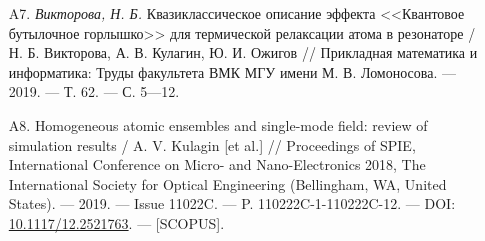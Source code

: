 {\begin{itemize}[leftmargin=24pt]
	\item[A7.]{\textit{Викторова, Н. Б.} Квазиклассическое описание эффекта <<Квантовое бутылочное горлышко>> для термической релаксации атома в резона­торе / Н. Б. Викторова, А. В. Кулагин, Ю. И. Ожигов // Прикладная математика и информатика: Труды факультета ВМК МГУ имени М. В. Ломоносова. — 2019. — Т. 62. — С. 5—12.}
	\item[A8.]{Homogeneous atomic ensembles and single-mode field: review of simulation results / A. V. Kulagin [et al.] // Proceedings of SPIE, International Conference on Micro- and Nano-Electronics 2018, The International Society for Optical Engineering (Bellingham, WA, United States). — 2019. — Issue 11022C. — P. 110222C-1-110222C-12. — DOI: \href{http://dx.doi.org/10.1117/12.2521763}{10.1117/12.2521763}. — [SCOPUS].}
\end{itemize}
}

